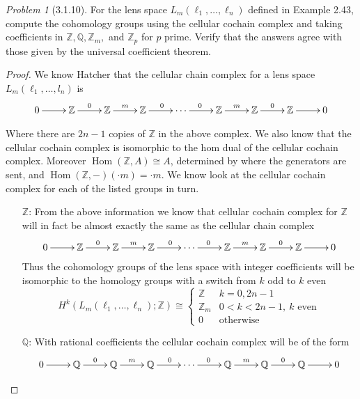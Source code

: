 \documentclass[10pt]{article}
\newcommand{\bb}[1]{\mathbb{#1}}
\DeclareMathOperator{\Hom}{Hom}
\theoremstyle{remark}
\newtheorem{problem}{Problem}
\begin{document}
\begin{problem}[3.1.10]
  For the lens space $L_m(\ell_1,\ldots,\ell_n)$ defined in Example 2.43,
  compute the cohomology groups using the cellular cochain complex
  and taking coefficients in $\bb{Z},\bb{Q},\bb{Z}_m,$ and $\bb{Z}_p$
  for $p$ prime. Verify that the answers agree with those given by the
  universal coefficient theorem.
\end{problem}

\begin{proof}
  We know Hatcher that the cellular chain complex for a lens space
  $L_m(\ell_1,\ldots,l_n)$ is
  \[
    \xymatrix{
      0 \ar[r] & \bb{Z} \ar[r]^0 & \bb{Z} \ar[r]^m & \bb{Z} \ar[r]^0 & \cdots \ar[r]^0 & \bb{Z} \ar[r]^m & \bb{Z} \ar[r]^0 & \bb{Z} \ar[r] & 0
    }
  \]

  Where there are $2n-1$ copies of $\bb{Z}$ in the above complex.
  We also know that the cellular cochain complex is isomorphic to the hom dual
  of the cellular cochain complex. Moreover $\Hom(\bb{Z},A)\cong A$, determined by
  where the generators are sent, and $\Hom(\bb{Z},-)(\cdot m)=\cdot m$. We know look
  at the cellular cochain complex for each of the listed groups in turn.

  \begin{itemize}
  \item[$\bb{Z}$:] From the above information we know that cellular cochain
    complex for $\bb{Z}$ will in fact be almost exactly the same as the cellular chain complex
    \[
      \xymatrix{
        0 \ar[r] & \bb{Z} \ar[r]^0 & \bb{Z} \ar[r]^m & \bb{Z} \ar[r]^0 & \cdots \ar[r]^0 & \bb{Z} \ar[r]^m & \bb{Z} \ar[r]^0 & \bb{Z} \ar[r] & 0
      }
    \]
    Thus the cohomology groups of the lens space with integer coefficients
    will be isomorphic to the homology groups with a switch from $k$ odd to $k$ even
    \[
      H^k(L_m(\ell_1,\ldots,\ell_n);\bb{Z}) \cong  
      \left\{
        \begin{array}{ll}
          \bb{Z}& k=0,2n-1\\
          \bb{Z}_m& 0<k<2n-1,\ \text{$k$ even}\\
          0 & \text{otherwise}
        \end{array}
      \right.
    \]
  \item[$\bb{Q}$:] With rational coefficients the cellular cochain complex will
    be of the form
    \[
      \xymatrix{
        0 \ar[r] & \bb{Q} \ar[r]^0 & \bb{Q} \ar[r]^m & \bb{Q} \ar[r]^0 & \cdots \ar[r]^0 & \bb{Q} \ar[r]^m & \bb{Q} \ar[r]^0 & \bb{Q} \ar[r] & 0
      }
    \]


\end{itemize}
\end{proof}
\end{document}
